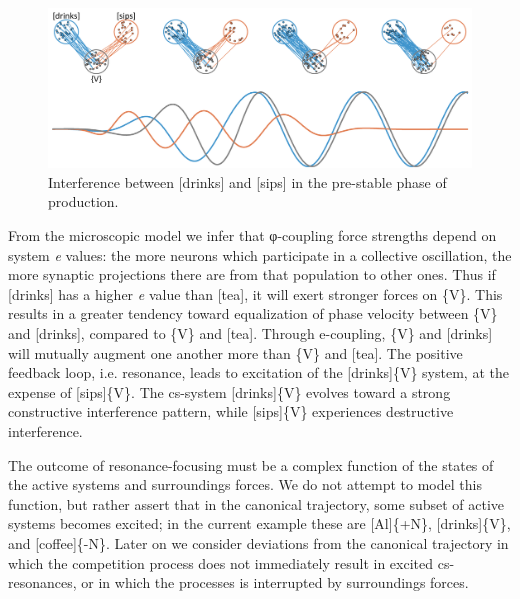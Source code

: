   
\begin{figure}
\includegraphics[width=\textwidth]{figures/Tilsen-img52.png}
\caption{Interference between [drinks] and [sips] in the pre-stable phase of production.}
\label{fig:4:2}
\end{figure}
 

  From the microscopic model we infer that φ{}-coupling force strengths depend on system \textit{e} values: the more neurons which participate in a collective oscillation, the more synaptic projections there are from that population to other ones. Thus if [drinks] has a higher \textit{e} value than [tea], it will exert stronger forces on \{V\}. This results in a greater tendency toward equalization of phase velocity between \{V\} and [drinks], compared to \{V\} and [tea]. Through e-coupling, \{V\} and [drinks] will mutually augment one another more than \{V\} and [tea]. The positive feedback loop, i.e. resonance, leads to excitation of the [drinks]\{V\} system, at the expense of [sips]\{V\}. The cs-system [drinks]\{V\} evolves toward a strong constructive interference pattern, while [sips]\{V\} experiences destructive interference.

  The outcome of resonance-focusing must be a complex function of the states of the active systems and surroundings forces. We do not attempt to model this function, but rather assert that in the canonical trajectory, some subset of active systems becomes excited; in the current example these are [Al]\{+N\}, [drinks]\{V\}, and [coffee]\{-N\}. Later on we consider deviations from the canonical trajectory in which the competition process does not immediately result in excited cs-resonances, or in which the processes is interrupted by surroundings forces.

